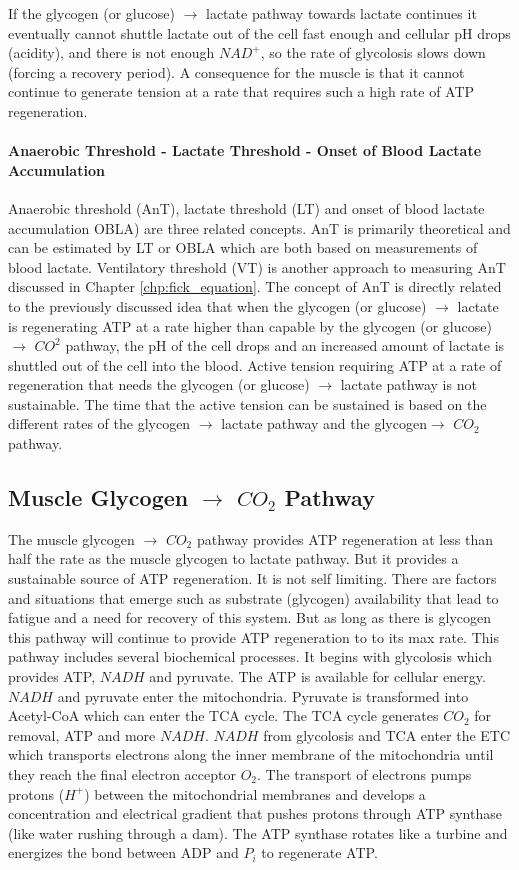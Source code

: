 If the glycogen (or glucose) $\rightarrow$ lactate pathway towards lactate continues it eventually cannot shuttle lactate out of the cell fast enough and cellular pH drops (acidity), and there is not enough $NAD^+$, so the rate of glycolosis slows down (forcing a recovery period). A consequence for the muscle is that it cannot continue to generate tension at a rate that requires such a high rate of ATP regeneration.

\paragraph{Anaerobic Threshold - Lactate Threshold - Onset of Blood Lactate Accumulation}
Anaerobic threshold (AnT), lactate threshold (LT) and onset of blood lactate accumulation OBLA) are three related concepts. AnT is primarily theoretical and can be estimated by LT or OBLA which are both based on measurements of blood lactate. Ventilatory threshold (VT) is another approach to measuring AnT discussed in Chapter \ref{chp:fick_equation}. The concept of AnT is directly related to the previously discussed idea that when the glycogen (or glucose) $\rightarrow$ lactate is regenerating ATP at a rate higher than capable by the glycogen (or glucose) $\rightarrow$ $CO^2$ pathway, the pH of the cell drops and an increased amount of lactate is shuttled out of the cell into the blood. Active tension requiring ATP at a rate of regeneration that needs the glycogen (or glucose) $\rightarrow$ lactate pathway is not sustainable. The time that the active tension can be sustained is based on the different rates of the glycogen $\rightarrow$ lactate pathway and the glycogen$\rightarrow$ $CO_2$ pathway.

\subsection{Muscle Glycogen $\rightarrow$ $CO_2$ Pathway}

The muscle glycogen $\rightarrow$ $CO_2$ pathway provides ATP regeneration at less than half the rate as the muscle glycogen to lactate pathway. But it provides a sustainable source of ATP regeneration. It is not self limiting. There are factors and situations that emerge such as substrate (glycogen) availability that lead to fatigue and a need for recovery of this system. But as long as there is glycogen this pathway will continue to provide ATP regeneration to to its max rate. This pathway includes several biochemical processes. It begins with glycolosis which provides ATP, $NADH$ and pyruvate. The ATP is available for cellular energy. $NADH$ and pyruvate enter the mitochondria. Pyruvate is transformed into Acetyl-CoA which can enter the TCA cycle. The TCA cycle generates $CO_2$ for removal, ATP and more $NADH$. $NADH$ from glycolosis and TCA enter the ETC which transports electrons along the inner membrane of the mitochondria until they reach the final electron acceptor $O_2$. The transport of electrons pumps protons ($H^+$) between the mitochondrial membranes and develops a concentration and electrical gradient that pushes protons through ATP synthase (like water rushing through a dam). The ATP synthase rotates like a turbine and energizes the bond between ADP and $P_i$ to regenerate ATP. 

